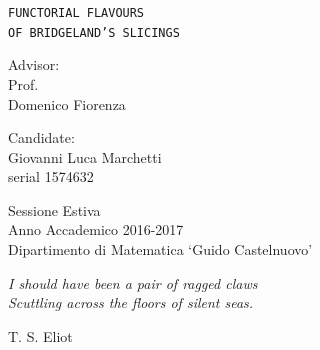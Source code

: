 \documentclass[12pt]{amsart}
\newcommand\blankpage{
    \null
    \thispagestyle{empty}
    \addtocounter{page}{-1}
    \newpage}
\theoremstyle{definition}
\begin{document}
\begin{titlepage}
\begin{center}
{\huge \texttt{FUNCTORIAL FLAVOURS}}  \\
\vspace{5 mm}
{\huge \texttt{OF BRIDGELAND'S SLICINGS}}
\vspace{40mm}
\end{center}
\par
\noindent
\begin{minipage}[t]{0.49\textwidth}
{\large{ Advisor:\\
Prof.\\
Domenico Fiorenza}
\begin{center}
\end{center}
}
\end{minipage}
\hfill
\begin{minipage}[t]{0.49\textwidth}\raggedleft
{\large{ Candidate:\\
Giovanni Luca Marchetti\\
serial 1574632}
\begin{center}
\end{center}
}
\end{minipage}
\vspace{18mm}
\begin{center}
{\large{ Sessione Estiva \\Anno Accademico 2016-2017}\\
Dipartimento di Matematica `Guido Castelnuovo'}
\end{center}
\end{titlepage}

\clearpage
\afterpage{\blankpage}

\clearpage
\epigraph{\textit{I should have been a pair of ragged claws \\ Scuttling across the floors of silent seas.}}{T. S. Eliot}
\vspace{40 mm}
\end{document}
